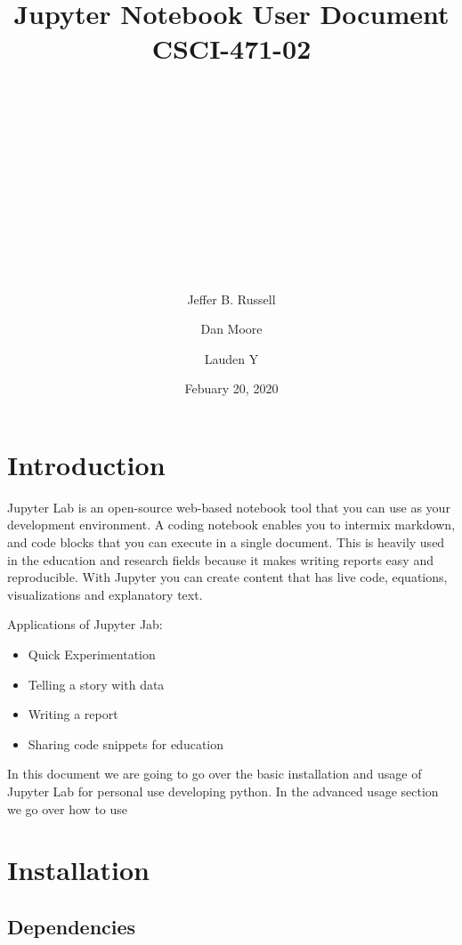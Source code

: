 \documentclass[pdftex,12pt]{artikel3}
\title{
\begin{center}
\huge{Jupyter Notebook User Document} \\
\huge{CSCI-471-02}\\
\end{center}
\\
\\
\\
\\
\\
\author{} %
\date{}   %
}
\begin{document}
\maketitle


\begin{center}
\author{Jeffer B. Russell}
\author{Dan Moore}
\author{Lauden Y}

\date{Febuary 20, 2020}
\end{center}

\newpage

\tableofcontents
{}
\newpage
\listoffigures
{}

\newpage

\section{Introduction}

Jupyter Lab is an open-source web-based notebook tool that you can use as your development environment.
A coding notebook enables you to intermix markdown, and code blocks that you can execute in a single document. This is heavily used in the education and research fields because it makes writing reports easy and reproducible. With Jupyter you can create content that has live code, equations, visualizations and explanatory text. 

Applications of Jupyter Jab:

\begin{itemize}
  \item Quick Experimentation
  \item Telling a story with data
  \item Writing a report
  \item Sharing code snippets for education
\end{itemize}

In this document we are going to go over the basic installation and usage of Jupyter Lab for personal use developing python. In the advanced usage section we go over how to use 

\section{Installation}

\subsection{Dependencies}
\end{document}
